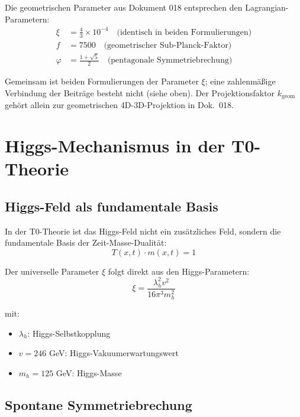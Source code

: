 	Die geometrischen Parameter aus Dokument 018 entsprechen den Lagrangian-Parametern:
	\begin{align}
		\xi &= \frac{4}{3} \times 10^{-4} \quad \text{(identisch in beiden Formulierungen)} \label{eq:xi_correspondence} \\
		f &= 7500 \quad \text{(geometrischer Sub-Planck-Faktor)} \label{eq:f_correspondence} \\
		\varphi &= \frac{1+\sqrt{5}}{2} \quad \text{(pentagonale Symmetriebrechung)} \label{eq:phi_correspondence}
	\end{align}
	
	Gemeinsam ist beiden Formulierungen der Parameter $\xi$; eine zahlenmäßige Verbindung der Beiträge besteht nicht (siehe oben). Der Projektionsfaktor $k_{\text{geom}}$ gehört allein zur geometrischen 4D-3D-Projektion in Dok.~018.
	
	\section{Higgs-Mechanismus in der T0-Theorie}
	
	\subsection{Higgs-Feld als fundamentale Basis}
	
	In der T0-Theorie ist das Higgs-Feld nicht ein zusätzliches Feld, sondern die fundamentale Basis der Zeit-Masse-Dualität:
	\begin{equation}
		T(x,t) \cdot m(x,t) = 1
		\label{eq:higgs_foundation}
	\end{equation}
	
	Der universelle Parameter $\xi$ folgt direkt aus den Higgs-Parametern:
	\begin{equation}
		\boxed{\xi = \frac{\lambda_h^2 v^2}{16\pi^3 m_h^2}}
		\label{eq:xi_from_higgs}
	\end{equation}
	
	mit:
	\begin{itemize}
		\item $\lambda_h$: Higgs-Selbstkopplung
		\item $v = 246$ GeV: Higgs-Vakuumerwartungswert
		\item $m_h = 125$ GeV: Higgs-Masse
	\end{itemize}
	
	\subsection{Spontane Symmetriebrechung}
	
